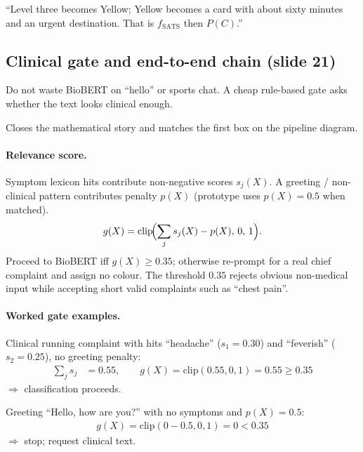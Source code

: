 \begin{saybox}
``Level three becomes Yellow; Yellow becomes a card with about sixty minutes and an urgent destination. That is \(f_{\mathrm{SATS}}\) then \(P(C)\).''
\end{saybox}

\subsection{Clinical gate and end-to-end chain (slide 21)}
\label{sec:expl-gate}

\begin{intuitbox}
Do not waste BioBERT on ``hello'' or sports chat.
A cheap rule-based gate asks whether the text looks clinical enough.
\end{intuitbox}

\begin{whybox}
Closes the mathematical story and matches the first box on the pipeline diagram.
\end{whybox}

\paragraph{Relevance score.}
Symptom lexicon hits contribute non-negative scores \(s_j(X)\).
A greeting / non-clinical pattern contributes penalty \(p(X)\) (prototype uses \(p(X)=0.5\) when matched).
\begin{equation}
  g(X) = \mathrm{clip}\!\Bigl(\sum_j s_j(X) - p(X),\, 0,\, 1\Bigr).
  \label{eq:gate}
\end{equation}
Proceed to BioBERT iff \(g(X)\ge 0.35\); otherwise re-prompt for a real chief complaint and assign no colour.
The threshold \(0.35\) rejects obvious non-medical input while accepting short valid complaints such as ``chest pain''.

\paragraph{Worked gate examples.}
Clinical running complaint with hits ``headache'' (\(s_1=0.30\)) and ``feverish'' (\(s_2=0.25\)), no greeting penalty:
\begin{align*}
  \sum_j s_j &= 0.55, \qquad g(X)=\mathrm{clip}(0.55,0,1)=0.55 \ge 0.35
\end{align*}
\(\Rightarrow\) classification proceeds.

Greeting ``Hello, how are you?'' with no symptoms and \(p(X)=0.5\):
\begin{align*}
  g(X)=\mathrm{clip}(0-0.5,0,1)=0 < 0.35
\end{align*}
\(\Rightarrow\) stop; request clinical text.

